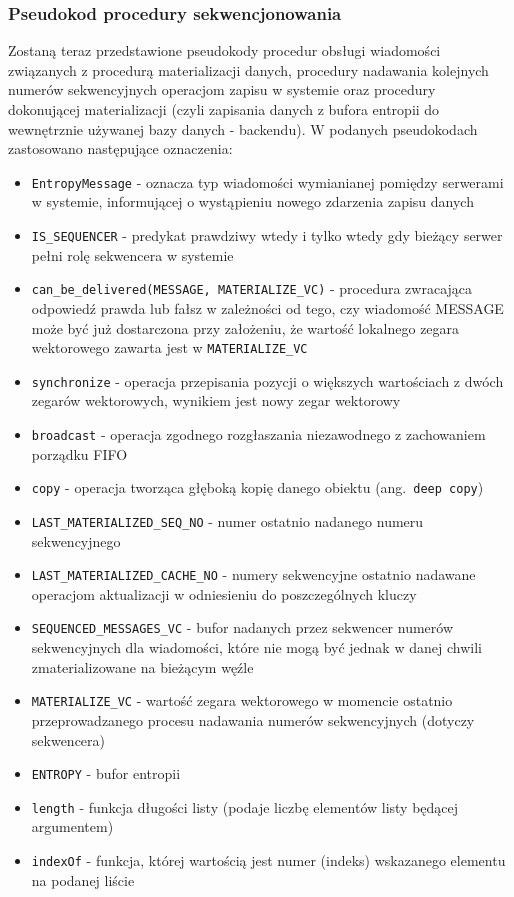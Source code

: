 \subsubsection*{Pseudokod procedury sekwencjonowania}

Zostaną teraz przedstawione pseudokody procedur obsługi wiadomości związanych z procedurą materializacji danych, procedury nadawania kolejnych numerów sekwencyjnych operacjom zapisu w systemie oraz procedury dokonującej materializacji (czyli zapisania danych z bufora entropii do wewnętrznie używanej bazy danych - backendu). W podanych pseudokodach zastosowano następujące oznaczenia:
\begin{itemize}
    \item \texttt{EntropyMessage} - oznacza typ wiadomości wymianianej pomiędzy serwerami w systemie, informującej o wystąpieniu nowego zdarzenia zapisu danych
    \item \texttt{IS\_SEQUENCER} - predykat prawdziwy wtedy i tylko wtedy gdy bieżący serwer pełni rolę sekwencera w systemie
    \item \texttt{can\_be\_delivered(MESSAGE, MATERIALIZE\_VC)} - procedura zwracająca odpowiedź prawda lub fałsz w zależności od tego, czy wiadomość MESSAGE może być już dostarczona przy założeniu, że wartość lokalnego zegara wektorowego zawarta jest w \texttt{MATERIALIZE\_VC}
    \item \texttt{synchronize} - operacja przepisania pozycji o większych wartościach z dwóch zegarów wektorowych, wynikiem jest nowy zegar wektorowy
    \item \texttt{broadcast} - operacja zgodnego rozgłaszania niezawodnego z zachowaniem porządku FIFO
    \item \texttt{copy} - operacja tworząca głęboką kopię danego obiektu (ang.\ \texttt{deep copy})
    \item \texttt{LAST\_MATERIALIZED\_SEQ\_NO} - numer ostatnio nadanego numeru sekwencyjnego
    \item \texttt{LAST\_MATERIALIZED\_CACHE\_NO} - numery sekwencyjne ostatnio nadawane operacjom aktualizacji w odniesieniu do poszczególnych kluczy
    \item \texttt{SEQUENCED\_MESSAGES\_VC} - bufor nadanych przez sekwencer numerów sekwencyjnych dla wiadomości, które nie mogą być jednak w danej chwili zmaterializowane na bieżącym węźle
    \item \texttt{MATERIALIZE\_VC} - wartość zegara wektorowego w momencie ostatnio przeprowadzanego procesu nadawania numerów sekwencyjnych (dotyczy sekwencera)
    \item \texttt{ENTROPY} - bufor entropii
    \item \texttt{length} - funkcja długości listy (podaje liczbę elementów listy będącej argumentem)
    \item \texttt{indexOf} - funkcja, której wartością jest numer (indeks) wskazanego elementu na podanej liście
\end{itemize}

